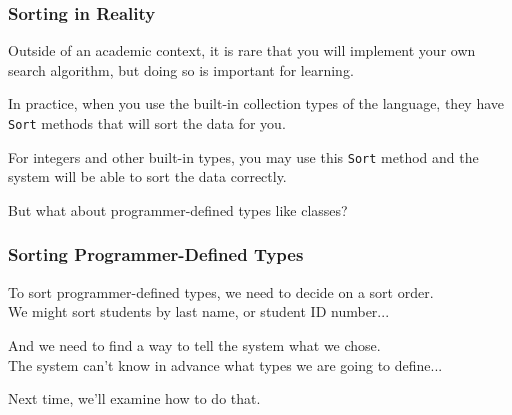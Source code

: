 \begin{frame}
\frametitle{Sorting in Reality}
Outside of an academic context, it is rare that you will implement your own search algorithm, but doing so is important for learning.

In practice, when you use the built-in collection types of the language, they have \texttt{Sort} methods that will sort the data for you.

For integers and other built-in types, you may use this \texttt{Sort} method and the system will be able to sort the data correctly.

But what about programmer-defined types like classes?

\end{frame}


\begin{frame}
\frametitle{Sorting Programmer-Defined Types}
To sort programmer-defined types, we need to decide on a sort order.\\
\quad We might sort students by last name, or student ID number... 

And we need to find a way to tell the system what we chose.\\
The system can't know in advance what types we are going to define...

Next time, we'll examine how to do that.
\end{frame}






